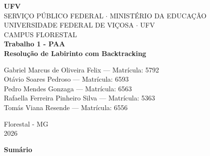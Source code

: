 \documentclass[12pt,a4paper]{article}
\renewcommand{\_}{\textunderscore\allowbreak}
\begin{document}
\thispagestyle{empty}
\begin{center}
    {\fontsize{38}{42}\selectfont \textbf{\textsf{\textcolor[RGB]{25,25,25}{U}\hspace{1pt}\textcolor[RGB]{150,20,20}{F}\hspace{1pt}\textcolor[RGB]{200,140,20}{V}}}}\\[0.25cm]
    {\normalsize SERVIÇO PÚBLICO FEDERAL $\cdot$ MINISTÉRIO DA EDUCAÇÃO}\\[0.12cm]
    {\normalsize UNIVERSIDADE FEDERAL DE VIÇOSA $\cdot$ UFV}\\[0.12cm]
    {\normalsize CAMPUS FLORESTAL}\\[4.8cm]

    {\large \textbf{Trabalho 1 - PAA}}\\[0.3cm]
    {\large \textbf{Resolução de Labirinto com Backtracking}}\\[5.0cm]

    \begin{flushright}
        Gabriel Marcus de Oliveira Felix --- Matrícula: 5792 \\
        Otávio Soares Pedroso --- Matrícula: 6593 \\
        Pedro Mendes Gonzaga --- Matrícula: 6563 \\
        Rafaella Ferreira Pinheiro Silva --- Matrícula: 5363 \\
        Tomás Viana Resende --- Matrícula: 6556
    \end{flushright}

    \vfill
    {\normalsize Florestal - MG}\\[0.12cm]
    {\normalsize 2026}
\end{center}

\newpage
\setcounter{page}{2}
\thispagestyle{fancy}

\begin{center}
    \textbf{\large Sumário}
\end{center}
\vspace{1.0cm}
\end{document}
